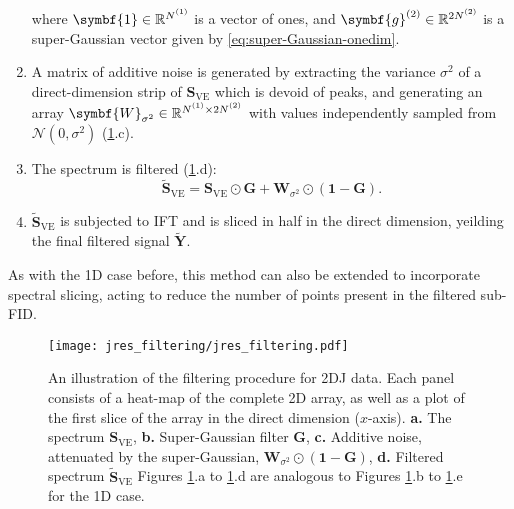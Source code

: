\begin{enumerate}
        where $\symbf{1} \in \mathbb{R}^{\None}$ is a vector of ones, and
        $\symbf{g}^{(2)} \in \mathbb{R}^{2\Ntwo}$ is a super-Gaussian vector
        given by \cref{eq:super-Gaussian-onedim}.
    \item A matrix of additive noise is generated by extracting the variance
        $\sigma^2$ of a direct-dimension strip of $\symbf{S}_{\text{VE}}$ which
        is devoid of peaks, and generating an array $\symbf{W}_{\sigma^2} \in
        \mathbb{R}^{\None \times 2 \Ntwo}$ with values independently sampled
        from $\mathcal{N}(0, \sigma^2)$ (\cref{fig:jres-filtering}.c).
    \item The spectrum is filtered (\cref{fig:jres-filtering}.d):
        \begin{equation}
            \widetilde{\symbf{S}}_{\text{VE}} = \symbf{S}_{\text{VE}} \odot
            \symbf{G} + \symbf{W}_{\sigma^2} \odot (\symbf{1} - \symbf{G}).
        \end{equation}
    \item $\widetilde{\symbf{S}}_{\text{VE}}$ is subjected to \ac{IFT} and is
        sliced in half in the direct dimension, yeilding the final filtered
        signal $\widetilde{\symbf{Y}}$.
\end{enumerate}
As with the \ac{1D} case before, this method can also be extended to
incorporate spectral slicing, acting to reduce the number of points present in
the filtered sub-\ac{FID}.

\begin{figure}
    \centering
    \texttt{[image: jres\_filtering/jres\_filtering.pdf]}
    \caption[
        An illustration of the filtering procedure for \ac{2DJ} data.
    ]
    {
        An illustration of the filtering procedure for \ac{2DJ} data.
        Each panel consists of a heat-map of the complete \ac{2D} array, as well as
        a plot of the first slice of the array in the direct dimension ($x$-axis).
        \textbf{a.} The spectrum $\symbf{S}_{\text{VE}}$,
        \textbf{b.} Super-Gaussian filter $\symbf{G}$,
        \textbf{c.} Additive noise, attenuated by the super-Gaussian, $\symbf{W}_{\sigma^2} \odot (\symbf{1} - \symbf{G})$,
        \textbf{d.} Filtered spectrum $\widetilde{\symbf{S}}_{\text{VE}}$
        Figures \ref{fig:jres-filtering}.a to \ref{fig:jres-filtering}.d
        are analogous to
        Figures \ref{fig:jres-filtering}.b to \ref{fig:jres-filtering}.e
        for the \ac{1D} case.
    }
    \label{fig:jres-filtering}
\end{figure}


